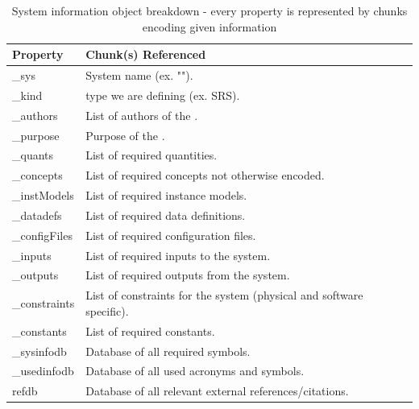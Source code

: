 \begin{table}[]
\caption{System information object breakdown - every property is represented by 
chunks encoding given information}
\label{tab:siBreakdown}
\begin{tabular}{| P{.2\linewidth} | p{.8\linewidth}|}
\hline
 \textbf{Property} & \textbf{Chunk(s) Referenced}


\\ \hline
	\_sys & System name (ex. "\gb{}").


\\ \hline
	\_kind & \SF{} type we are defining (ex. SRS).


\\ \hline
	\_authors & List of authors of the \sf{}.


\\ \hline
	\_purpose & Purpose of the \sf{}.


\\ \hline
	\_quants & List of required quantities.


\\ \hline
	\_concepts & List of required concepts not otherwise encoded.


\\ \hline
	\_instModels & List of required instance models.


\\ \hline
	\_datadefs & List of required data definitions.


\\ \hline
	\_configFiles & List of required configuration files.


\\ \hline
	\_inputs & List of required inputs to the system.


\\ \hline
	\_outputs & List of required outputs from the system.


\\ \hline
	\_constraints & List of constraints for the system (physical and software 
	specific).


\\ \hline
	\_constants & List of required constants. 


\\ \hline
	\_sysinfodb & Database of all required symbols. 


\\ \hline
	\_usedinfodb & Database of all used acronyms and symbols. 


\\ \hline
	refdb & Database of all relevant external references/citations.

	
\\ \hline
\end{tabular}
\end{table}
 
